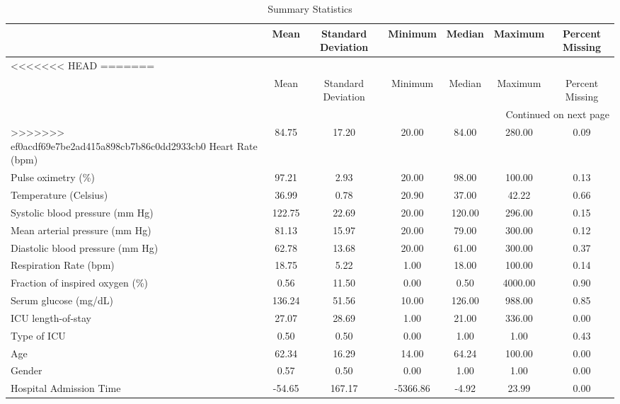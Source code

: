 \begin{table}
\centering
\caption{Summary Statistics}
\label{tab_describe}
\begin{tabular}{lcccccc}
\toprule
{} &   Mean & Standard Deviation &  Minimum & Median & Maximum & Percent Missing \\
\midrule
<<<<<<< HEAD
=======
\hline
\endfirsthead
\caption[]{Summary Statistics} \\
\toprule
{} &   Mean & Standard Deviation &  Minimum & Median & Maximum & Percent Missing \\
\midrule
\endhead
\midrule
\multicolumn{7}{r}{{Continued on next page}} \\
\midrule
\hline
\endfoot

\bottomrule
\hline
\endlastfoot
>>>>>>> ef0acdf69e7be2ad415a898cb7b86c0dd2933cb0
Heart Rate (bpm)                 &  84.75 &              17.20 &    20.00 &  84.00 &  280.00 &            0.09 \\
Pulse oximetry (\%)               &  97.21 &               2.93 &    20.00 &  98.00 &  100.00 &            0.13 \\
Temperature (Celsius)            &  36.99 &               0.78 &    20.90 &  37.00 &   42.22 &            0.66 \\
Systolic blood pressure (mm Hg)  & 122.75 &              22.69 &    20.00 & 120.00 &  296.00 &            0.15 \\
Mean arterial pressure (mm Hg)   &  81.13 &              15.97 &    20.00 &  79.00 &  300.00 &            0.12 \\
Diastolic blood pressure (mm Hg) &  62.78 &              13.68 &    20.00 &  61.00 &  300.00 &            0.37 \\
Respiration Rate (bpm)           &  18.75 &               5.22 &     1.00 &  18.00 &  100.00 &            0.14 \\
Fraction of inspired oxygen (\%)  &   0.56 &              11.50 &     0.00 &   0.50 & 4000.00 &            0.90 \\
Serum glucose (mg/dL)            & 136.24 &              51.56 &    10.00 & 126.00 &  988.00 &            0.85 \\
ICU length-of-stay               &  27.07 &              28.69 &     1.00 &  21.00 &  336.00 &            0.00 \\
Type of ICU                      &   0.50 &               0.50 &     0.00 &   1.00 &    1.00 &            0.43 \\
Age                              &  62.34 &              16.29 &    14.00 &  64.24 &  100.00 &            0.00 \\
Gender                           &   0.57 &               0.50 &     0.00 &   1.00 &    1.00 &            0.00 \\
Hospital Admission Time          & -54.65 &             167.17 & -5366.86 &  -4.92 &   23.99 &            0.00 \\
\bottomrule
\end{tabular}
\end{table}
